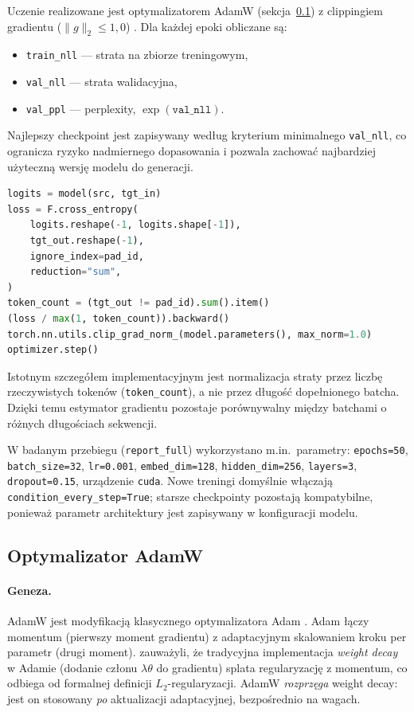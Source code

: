 \documentclass[12pt,a4paper]{article}
\begin{document}
Uczenie realizowane jest optymalizatorem AdamW (sekcja~\ref{sec:adamw}) z clippingiem gradientu ($\|g\|_2 \le 1{,}0$) \citep{pascanu2013difficulty}. Dla każdej epoki obliczane są:
\begin{itemize}[leftmargin=1.5em]
    \item \texttt{train\_nll} --- strata na zbiorze treningowym,
    \item \texttt{val\_nll} --- strata walidacyjna,
    \item \texttt{val\_ppl} --- perplexity, $\exp(\texttt{val\_nll})$.
\end{itemize}
Najlepszy checkpoint jest zapisywany według kryterium minimalnego \texttt{val\_nll}, co ogranicza ryzyko nadmiernego dopasowania i pozwala zachować najbardziej użyteczną wersję modelu do generacji.

\begin{lstlisting}[language=Python,caption={Krok optymalizacji --- moduł treningowy.}]
logits = model(src, tgt_in)
loss = F.cross_entropy(
    logits.reshape(-1, logits.shape[-1]),
    tgt_out.reshape(-1),
    ignore_index=pad_id,
    reduction="sum",
)
token_count = (tgt_out != pad_id).sum().item()
(loss / max(1, token_count)).backward()
torch.nn.utils.clip_grad_norm_(model.parameters(), max_norm=1.0)
optimizer.step()
\end{lstlisting}

Istotnym szczegółem implementacyjnym jest normalizacja straty przez liczbę rzeczywistych tokenów (\texttt{token\_count}), a nie przez długość dopełnionego batcha. Dzięki temu estymator gradientu pozostaje porównywalny między batchami o różnych długościach sekwencji.

W badanym przebiegu (\texttt{report\_full}) wykorzystano m.in.\ parametry: \texttt{epochs=50}, \texttt{batch\_size=32}, \texttt{lr=0.001}, \texttt{embed\_dim=128}, \texttt{hidden\_dim=256}, \texttt{layers=3}, \texttt{dropout=0.15}, urządzenie \texttt{cuda}. Nowe treningi domyślnie włączają \texttt{condition\_every\_step=True}; starsze checkpointy pozostają kompatybilne, ponieważ parametr architektury jest zapisywany w konfiguracji modelu.

\subsection{Optymalizator AdamW}
\label{sec:adamw}

\paragraph{Geneza.}
AdamW \citep{loshchilov2019adamw} jest modyfikacją klasycznego optymalizatora Adam \citep{kingma2015adam}. Adam łączy momentum (pierwszy moment gradientu) z adaptacyjnym skalowaniem kroku per parametr (drugi moment). \citet{loshchilov2019adamw} zauważyli, że tradycyjna implementacja \emph{weight decay} w Adamie (dodanie członu $\lambda \theta$ do gradientu) splata regularyzację z momentum, co odbiega od formalnej definicji $L_2$-regularyzacji. AdamW \emph{rozprzęga} weight decay: jest on stosowany \emph{po} aktualizacji adaptacyjnej, bezpośrednio na wagach.
\end{document}
